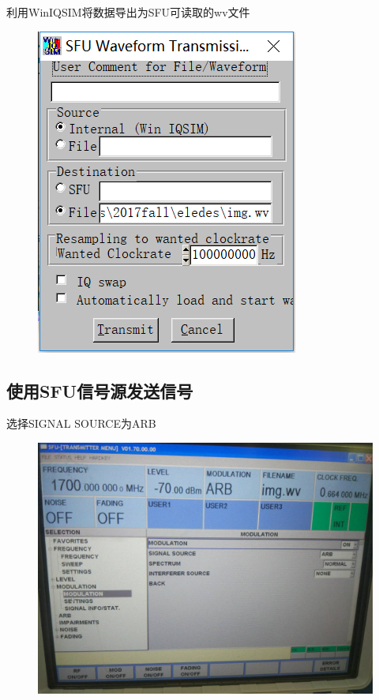 \documentclass[UTF8]{ctexart}
\begin{document}
利用WinIQSIM将数据导出为SFU可读取的wv文件

\begin{figure}[H]
        \centering
        \includegraphics[width=\textwidth]{images//getwv.png}
\end{figure}

\subsection{使用SFU信号源发送信号}

选择SIGNAL SOURCE为ARB

\begin{figure}[H]
        \centering
        \includegraphics[width=\textwidth]{images//setARB.jpg}
\end{figure}
\end{document}
